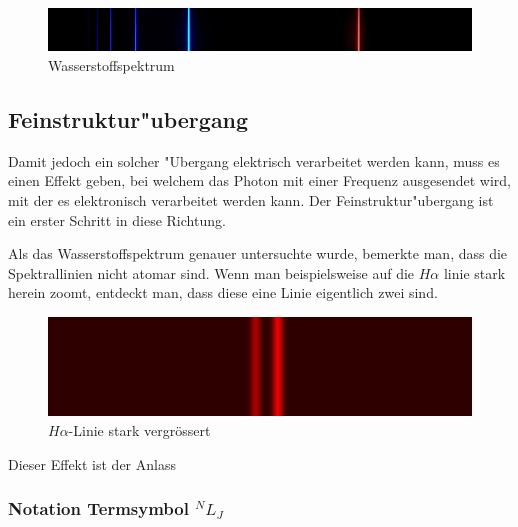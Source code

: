 \begin{refsection}
\begin{figure}[h!]
	\centering
	\includegraphics[width = .6\columnwidth]{../vortrag/pictures/wasserstoffSpektrum.jpg}
	\caption{Wasserstoffspektrum} %
\end{figure}


% 


\subsection{Feinstruktur"ubergang}
Damit jedoch ein solcher "Ubergang elektrisch verarbeitet werden kann, muss es einen Effekt geben, bei welchem das Photon mit einer Frequenz ausgesendet wird, mit der es elektronisch verarbeitet werden kann.
Der Feinstruktur"ubergang ist ein erster Schritt in diese Richtung. 

Als das Wasserstoffspektrum genauer untersuchte wurde, bemerkte man, dass die Spektrallinien nicht atomar sind. Wenn man beispielsweise auf die $H\alpha$ linie stark herein zoomt, entdeckt man, dass diese eine Linie eigentlich zwei sind. 

\begin{figure}[h!]
	\centering
	\includegraphics[width = .6\columnwidth]{../vortrag/pictures/fine_structure_hydrogen.png}
	\caption{$H\alpha$-Linie stark vergrössert} %
\end{figure}

Dieser Effekt ist der Anlass

\subsubsection{Notation Termsymbol $^N L _J$}


\end{refsection}
